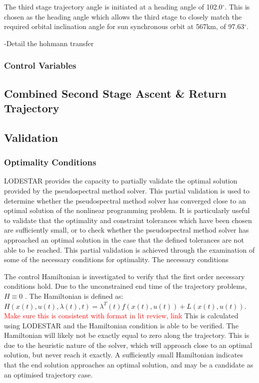 The third stage trajectory angle is initiated at a heading angle of 102.0$^\circ$. This is chosen as the heading angle which allows the third stage to closely match the required orbital inclination angle for sun synchronous orbit at 567km, of 97.63$^\circ$. 


-Detail the hohmann transfer

\subsubsection{Control Variables}

\subsection{Combined Second Stage Ascent \& Return  Trajectory}

\subsection{Validation}
\subsubsection{Optimality Conditions}

LODESTAR provides the capacity to partially validate the optimal solution provided by the pseudospectral method solver. This partial validation is used to determine whether the pseudospectral method solver has converged close to an optimal solution of the nonlinear programming problem. It is particularly useful to validate that the optimality and constraint tolerances which have been chosen are sufficiently small, or to check whether the pseudospectral method solver has approached an optimal solution in the case that the defined tolerances are not able to be reached.   
This partial validation is achieved through the examination of some of the necessary conditions for optimality. The necessary conditions 

The control Hamiltonian is investigated to verify that the first order necessary conditions hold. Due to the unconstrained end time of the trajectory problems, $H\equiv 0 $ \cite{Pucci2007}. The Hamiltonian is defined as: $H(x(t),u(t),\lambda(t),t) = \lambda^T(t)f(x(t),u(t))+L(x(t),u(t))$.
\textcolor{red}{Make sure this is consistent with format in lit review, link}
This is calculated using LODESTAR and the Hamiltonian condition is able to be verified. The Hamiltonian will likely not be exactly equal to zero along the trajectory. This is due to the heuristic nature of the solver, which will approach close to an optimal solution, but never reach it exactly. A sufficiently small Hamiltonian indicates that the end solution approaches an optimal solution, and may be a candidate as an optimised trajectory case. 



